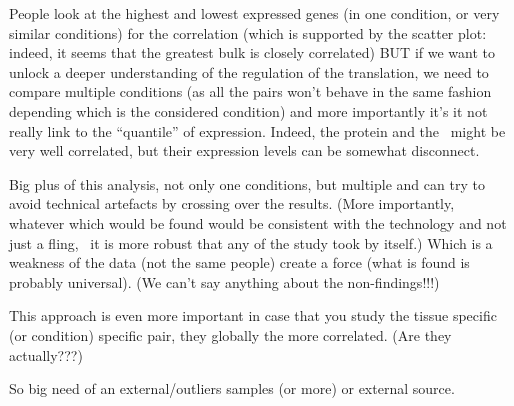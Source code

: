 People look at the highest and lowest expressed genes (in one condition, or very
similar conditions) for the correlation (which is supported by the scatter plot:
indeed, it seems that the greatest bulk is closely correlated) {\Large BUT} if we
want to unlock a deeper understanding of the regulation of the translation, we need
to compare multiple conditions (as all the pairs won't behave in the same fashion
depending which is the considered condition) and more importantly it's it not
really link to the ``quantile'' of expression. Indeed, the protein and the \mRNA\
might be very well correlated, but their expression levels can be somewhat disconnect.

Big plus of this analysis, not only one conditions, but multiple and can try to
avoid technical artefacts by crossing over the results. (More importantly, whatever
which would be found would be consistent with the technology and not just a fling,
\ie\ it is more robust that any of the study took by itself.)
Which is a weakness of the data (not the same people) create a force (what is found
is probably universal). (We can't say anything about the non-findings!!!)

This approach is even more important in case that you study the tissue specific
(or condition) specific pair, they globally the more correlated. (Are they actually???)

So big need of an external/outliers samples (or more) or external source.


\begin{comment}
\TK{Proteome sensé être plus conserver que le RNA : citation}
\end{comment}










